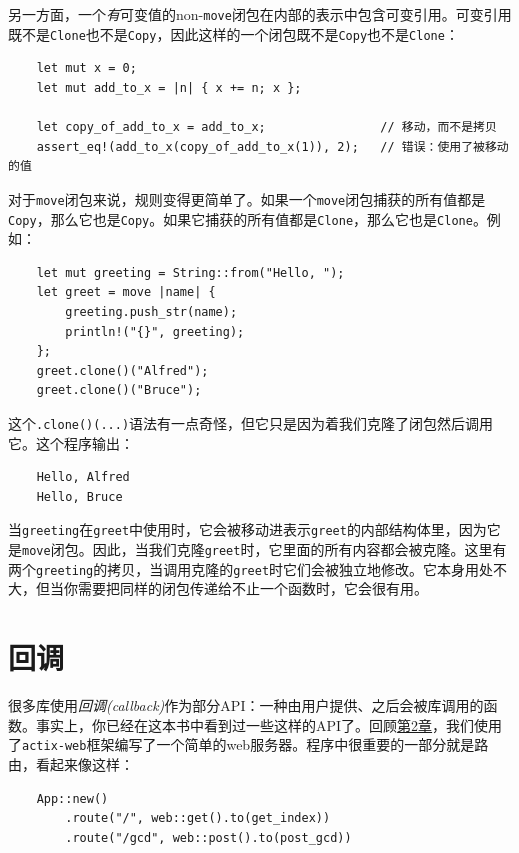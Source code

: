 另一方面，一个\emph{有}可变值的non-\texttt{move}闭包在内部的表示中包含可变引用。可变引用既不是\texttt{Clone}也不是\texttt{Copy}，因此这样的一个闭包既不是\texttt{Copy}也不是\texttt{Clone}：
\begin{verbatim}
    let mut x = 0;
    let mut add_to_x = |n| { x += n; x };

    let copy_of_add_to_x = add_to_x;                // 移动，而不是拷贝
    assert_eq!(add_to_x(copy_of_add_to_x(1)), 2);   // 错误：使用了被移动的值
\end{verbatim}

对于\texttt{move}闭包来说，规则变得更简单了。如果一个\texttt{move}闭包捕获的所有值都是\texttt{Copy}，那么它也是\texttt{Copy}。如果它捕获的所有值都是\texttt{Clone}，那么它也是\texttt{Clone}。例如：
\begin{verbatim}
    let mut greeting = String::from("Hello, ");
    let greet = move |name| {
        greeting.push_str(name);
        println!("{}", greeting);
    };
    greet.clone()("Alfred");
    greet.clone()("Bruce");
\end{verbatim}

这个\texttt{.clone()(...)}语法有一点奇怪，但它只是因为着我们克隆了闭包然后调用它。这个程序输出：
\begin{verbatim}
    Hello, Alfred
    Hello, Bruce
\end{verbatim}

当\texttt{greeting}在\texttt{greet}中使用时，它会被移动进表示\texttt{greet}的内部结构体里，因为它是\texttt{move}闭包。因此，当我们克隆\texttt{greet}时，它里面的所有内容都会被克隆。这里有两个\texttt{greeting}的拷贝，当调用克隆的\texttt{greet}时它们会被独立地修改。它本身用处不大，但当你需要把同样的闭包传递给不止一个函数时，它会很有用。

\section{回调}\label{callback}

很多库使用\emph{回调(callback)}作为部分API：一种由用户提供、之后会被库调用的函数。事实上，你已经在这本书中看到过一些这样的API了。回顾\hyperref[ch02]{第2章}，我们使用了\texttt{actix-web}框架编写了一个简单的web服务器。程序中很重要的一部分就是路由，看起来像这样：
\begin{verbatim}
    App::new()
        .route("/", web::get().to(get_index))
        .route("/gcd", web::post().to(post_gcd))
\end{verbatim}

